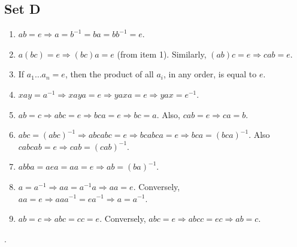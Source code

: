 \documentclass{article}
\begin{document}
\subsection*{Set D}
\begin{enumerate}
    \item $ab = e \Rightarrow a = b^{-1} = ba = bb^{-1} = e$.
    \item $a(bc) = e \Rightarrow (bc)a = e$ (from item 1). Similarly, $(ab)c = e \Rightarrow cab = e$.
    \item If $a_1\ldots a_n = e$, then the product of all $a_i$, in any order, is equal to $e$.
    \item $xay = a^{-1} \Rightarrow xaya = e \Rightarrow yaxa = e \Rightarrow yax = e^{-1}$.
    \item $ab = c \Rightarrow abc = e \Rightarrow bca = e \Rightarrow bc = a$. Also, $cab = e \Rightarrow ca = b$.
    \item $abc = (abc)^{-1} \Rightarrow abcabc = e \Rightarrow bcabca = e \Rightarrow bca = (bca)^{-1}$. Also $cabcab = e \Rightarrow cab = (cab)^{-1}$.
    \item $abba = aea = aa = e \Rightarrow ab = (ba)^{-1}$.
    \item $a = a^{-1} \Rightarrow aa = a^{-1}a \Rightarrow aa = e$. Conversely, $aa = e \Rightarrow aaa^{-1} = ea^{-1} \Rightarrow a = a^{-1}$.
    \item $ab = c \Rightarrow abc = cc = e$. Conversely, $abc = e \Rightarrow abcc = ec \Rightarrow ab = c$.
\end{enumerate}.
\end{document}

